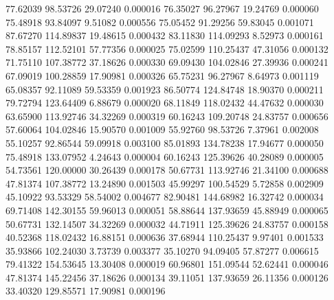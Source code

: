        77.62039       98.53726       29.07240       0.000016
       76.35027       96.27967       19.24769       0.000060
       75.48918       93.84097        9.51082       0.000556
       75.05452       91.29256       59.83045       0.001071
       87.67270      114.89837       19.48615       0.000432
       83.11830      114.09293        8.52973       0.000161
       78.85157      112.52101       57.77356       0.000025
       75.02599      110.25437       47.31056       0.000132
       71.75110      107.38772       37.18626       0.000330
       69.09430      104.02846       27.39936       0.000241
       67.09019      100.28859       17.90981       0.000326
       65.75231       96.27967        8.64973       0.001119
       65.08357       92.11089       59.53359       0.001923
       86.50774      124.84748       18.90370       0.000211
       79.72794      123.64409        6.88679       0.000020
       68.11849      118.02432       44.47632       0.000030
       63.65900      113.92746       34.32269       0.000319
       60.16243      109.20748       24.83757       0.000656
       57.60064      104.02846       15.90570       0.001009
       55.92760       98.53726        7.37961       0.002008
       55.10257       92.86544       59.09918       0.003100
       85.01893      134.78238       17.94677       0.000050
       75.48918      133.07952        4.24643       0.000004
       60.16243      125.39626       40.28089       0.000005
       54.73561      120.00000       30.26439       0.000178
       50.67731      113.92746       21.34100       0.000688
       47.81374      107.38772       13.24890       0.001503
       45.99297      100.54529        5.72858       0.002909
       45.10922       93.53329       58.54002       0.004677
       82.90481      144.68982       16.32742       0.000034
       69.71408      142.30155       59.96013       0.000051
       58.88644      137.93659       45.88949       0.000065
       50.67731      132.14507       34.32269       0.000032
       44.71911      125.39626       24.83757       0.000158
       40.52368      118.02432       16.88151       0.000636
       37.68944      110.25437        9.97401       0.001533
       35.93866      102.24030        3.73739       0.003377
       35.10270       94.09405       57.87277       0.006615
       79.41322      154.53645       13.30408       0.000019
       60.96801      151.09544       52.62441       0.000046
       47.81374      145.22456       37.18626       0.000134
       39.11051      137.93659       26.11356       0.000126
       33.40320      129.85571       17.90981       0.000196
